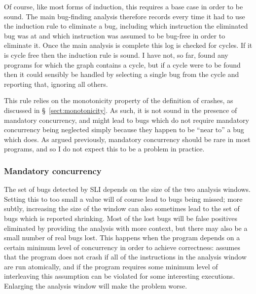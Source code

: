 Of course, like most forms of induction, this requires a base case in
order to be sound.  The main bug-finding analysis therefore records
every time it had to use the induction rule to eliminate a bug,
including which instruction the eliminated bug was at and which
instruction was assumed to be bug-free in order to eliminate it.  Once
the main analysis is complete this log is checked for cycles.  If it
is cycle free then the induction rule is sound.  I have not, so far,
found any programs for which the graph contains a cycle, but if a
cycle were to be found then it could sensibly be handled by selecting
a single bug from the cycle and reporting that, ignoring all others.

This rule relies on the monotonicity property of the definition of
crashes, as discussed in \S~\ref{sect:monotonicity}.  As such, it is
not sound in the presence of mandatory concurrency, and might lead to
bugs which do not require mandatory concurrency being neglected simply because they happen to be ``near
to'' a bug which does.  As argued previously, mandatory concurrency
should be rare in most programs, and so I do not expect this to be a
problem in practice.  


\subsubsection{Mandatory concurrency}
\label{sect:mandatory_concurrency}


The set of bugs detected by SLI depends on the size of the two
analysis windows.  Setting this to too small a value will of course
lead to bugs being missed; more subtly, increasing the size of the
window can also sometimes lead to the set of bugs which is reported
shrinking.  Most of the lost bugs will be false positives eliminated
by providing the analysis with more context, but there may also be a
small number of real bugs lost.  This happens when the program depends
on a certain minimum level of concurrency in order to achieve
correctness: {\technique} assumes that the program does not crash if
all of the instructions in the analysis window are run atomically, and
if the program requires some minimum level of interleaving this
assumption can be violated for some interesting executions.  Enlarging
the analysis window will make the problem worse.

